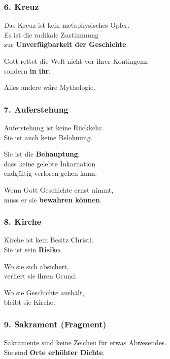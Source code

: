\documentclass[
]{article}
\begin{document}
\subsubsection{\texorpdfstring{\textbf{6. Kreuz}}{6. Kreuz}}\label{kreuz}

Das Kreuz ist kein metaphysisches Opfer.\\
Es ist die radikale Zustimmung\\
zur \textbf{Unverfügbarkeit der Geschichte}.

Gott rettet die Welt nicht vor ihrer Kontingenz,\\
sondern \textbf{in ihr}.

Alles andere wäre Mythologie.

\subsubsection{\texorpdfstring{\textbf{7. Auferstehung}}{7. Auferstehung}}\label{auferstehung}

Auferstehung ist keine Rückkehr.\\
Sie ist auch keine Belohnung.

Sie ist die \textbf{Behauptung},\\
dass keine gelebte Inkarnation\\
endgültig verloren gehen kann.

Wenn Gott Geschichte ernst nimmt,\\
muss er sie \textbf{bewahren können}.

\subsubsection{\texorpdfstring{\textbf{8. Kirche}}{8. Kirche}}\label{kirche}

Kirche ist kein Besitz Christi.\\
Sie ist sein \textbf{Risiko}.

Wo sie sich absichert,\\
verliert sie ihren Grund.

Wo sie Geschichte aushält,\\
bleibt sie Kirche.

\subsubsection{\texorpdfstring{\textbf{9. Sakrament (Fragment)}}{9. Sakrament (Fragment)}}\label{sakrament-fragment}

Sakramente sind keine Zeichen für etwas Abwesendes.\\
Sie sind \textbf{Orte erhöhter Dichte}.
\end{document}
